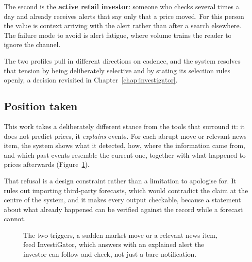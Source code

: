 The second is the \textbf{active retail investor}: someone who checks several times a day and
already receives alerts that say only that a price moved. For this person the value is context
arriving with the alert rather than after a search elsewhere. The failure mode to avoid is alert
fatigue, where volume trains the reader to ignore the channel.

The two profiles pull in different directions on cadence, and the system resolves that tension by
being deliberately selective and by stating its selection rules openly, a decision revisited in
Chapter~\ref{chap:investigator}.

\subsection*{Position taken}

This work takes a deliberately different stance from the tools that surround it: it does not
predict prices, it \emph{explains} events. For each abrupt move or relevant news item, the system
shows what it detected, how, where the information came from, and which past events resemble the
current one, together with what happened to prices afterwards (Figure~\ref{fig:concept}).

That refusal is a design constraint rather than a limitation to apologise for. It rules out
importing third-party forecasts, which would contradict the claim at the centre of the system, and
it makes every output checkable, because a statement about what already happened can be verified
against the record while a forecast cannot.

\begin{figure}[ht]
\centering
{}
\caption[What InvestiGator does]{The two triggers, a sudden market move or a relevant news item, feed InvestiGator,
which answers with an explained alert the investor can follow and check, not just a bare notification.}
\label{fig:concept}
\end{figure}


